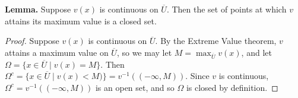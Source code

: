 \documentclass[11pt,oneside,english]{amsart}
\theoremstyle{definition}
\begin{document}
\begin{enumerate}
\begin{enumerate}
\textbf{Lemma.} Suppose $v(x)$ is continuous on $\overline{U}$. Then the set of points at which $v$ attains its maximum value is a closed set.

\begin{proof}
Suppose $v(x)$ is continuous on $\overline{U}$. By the Extreme Value theorem, $v$ attains a maximum value on $\overline{U}$, so we may let $M=\max_{\overline{U}}v(x)$, and let $\Omega=\{x\in \overline{U}\mid v(x)=M\}$. Then $\Omega^c=\{x\in \overline{U}\mid v(x)<M)\}=v^{-1}((-\infty,M))$. Since $v$ is continuous, $\Omega^c=v^{-1}((-\infty,M))$ is an open set, and so $\Omega$ is closed by definition.
\end{proof}

\end{enumerate}

\end{enumerate}
\end{document}
